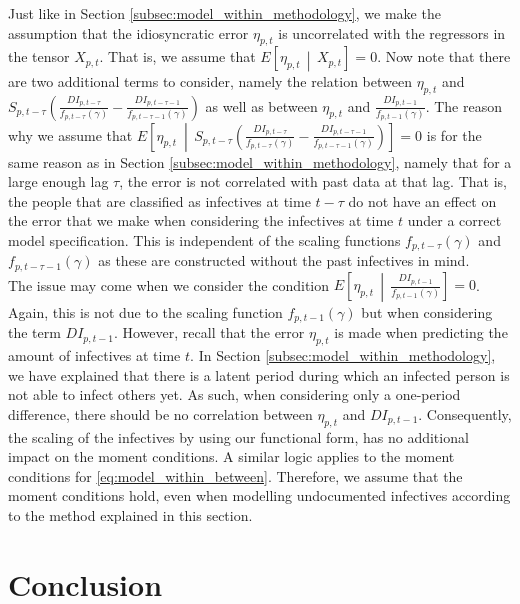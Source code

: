 \documentclass[12pt]{article}
\begin{document}
	Just like in Section \ref{subsec:model_within_methodology}, we make the assumption that the idiosyncratic error $\eta_{p,t}$ is uncorrelated with the regressors in the tensor $X_{p,t}$. That is, we assume that $E\left[\eta_{p,t} \,\middle|\, X_{p,t}\right] = 0$. Now note that there are two additional terms to consider, namely the relation between $\eta_{p,t}$ and $S_{p,t-\tau}\left(\frac{DI_{p,t-\tau}}{f_{p,t-\tau}(\gamma)} - \frac{DI_{p,t-\tau-1}}{f_{p,t-\tau-1}(\gamma)}\right)$ as well as between $\eta_{p,t}$ and $\frac{DI_{p,t-1}}{f_{p,t-1}(\gamma)}$. The reason why we assume that $E\left[\eta_{p,t} ~\middle|\, S_{p,t-\tau}\left(\frac{DI_{p,t-\tau}}{f_{p,t-\tau}(\gamma)} - \frac{DI_{p,t-\tau-1}}{f_{p,t-\tau-1}(\gamma)}\right)\right] = 0$ is for the same reason as in Section \ref{subsec:model_within_methodology}, namely that for a large enough lag $\tau$, the error is not correlated with past data at that lag. That is, the people that are classified as infectives at time $t-\tau$ do not have an effect on the error that we make when considering the infectives at time $t$ under a correct model specification. This is independent of the scaling functions $f_{p,t-\tau}(\gamma)$ and $f_{p,t-\tau-1}(\gamma)$ as these are constructed without the past infectives in mind. \\
	
	The issue may come when we consider the condition $E\left[\eta_{p,t} \,\middle|\,  \frac{DI_{p,t-1}}{f_{p,t-1}(\gamma)}\right] = 0$. Again, this is not due to the scaling function $f_{p,t-1}(\gamma)$ but when considering the term $DI_{p,t-1}$. However, recall that the error $\eta_{p,t}$ is made when predicting the amount of infectives at time $t$. In Section \ref{subsec:model_within_methodology}, we have explained that there is a latent period during which an infected person is not able to infect others yet. As such, when considering only a one-period difference, there should be no correlation between $\eta_{p,t}$ and $DI_{p,t-1}$. Consequently, the scaling of the infectives by using our functional form, has no additional impact on the moment conditions. A similar logic applies to the moment conditions for \eqref{eq:model_within_between}. Therefore, we assume that the moment conditions hold, even when modelling undocumented infectives according to the method explained in this section. 
	
	\newpage
	\section{Conclusion} \label{sec:conclusion}
	
\end{document}
